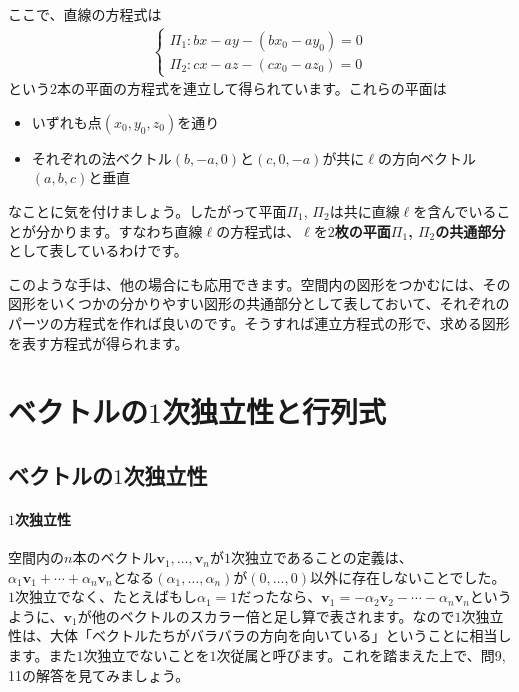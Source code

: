 ここで、直線の方程式は\vspace{-1zw}
\begin{align*}
\begin{cases}
\Pi_1\colon bx - ay - (b x_0 - a y_0) = 0 \\
\Pi_2\colon cx - az - (c x_0 - a z_0) = 0
\end{cases}
\end{align*}
という$2$本の平面の方程式を連立して得られています。これらの平面は
\begin{itemize}
\item いずれも点$(x_0, y_0, z_0)$を通り
\item それぞれの法ベクトル$(b, -a, 0)$と$(c, 0, -a)$が共に$\ell$の方向ベクトル$(a,b,c)$と垂直
\end{itemize}
なことに気を付けましょう。したがって平面$\Pi_1$, $\Pi_2$は共に直線$\ell$を含んでいることが分かります。すなわち直線$\ell$の方程式は、$\ell$を\textbf{$2$枚の平面$\Pi_1$, $\Pi_2$の共通部分}として表しているわけです。

このような手は、他の場合にも応用できます。空間内の図形をつかむには、その図形をいくつかの分かりやすい図形の共通部分として表しておいて、それぞれのパーツの方程式を作れば良いのです。そうすれば連立方程式の形で、求める図形を表す方程式が得られます。

\section{ベクトルの$1$次独立性と行列式}

\subsection{ベクトルの$1$次独立性}

\paragraph{$1$次独立性}
空間内の$n$本のベクトル$\bm{v}_1, \ldots, \bm{v}_n$が$1$次独立であることの定義は、$\alpha_1 \bm{v}_1 + \cdots + \alpha_n \bm{v}_n$となる$(\alpha_1,\ldots,\alpha_n)$が$(0,\ldots,0)$以外に存在しないことでした。$1$次独立でなく、たとえばもし$\alpha_1=1$だったなら、$\bm{v}_1 = -\alpha_2 \bm{v}_2 - \cdots - \alpha_n \bm{v}_n$というように、$\bm{v}_1$が他のベクトルのスカラー倍と足し算で表されます。なので$1$次独立性は、大体「ベクトルたちがバラバラの方向を向いている」ということに相当します。また$1$次独立でないことを$1$次従属と呼びます。これを踏まえた上で、問9, 11の解答を見てみましょう。

